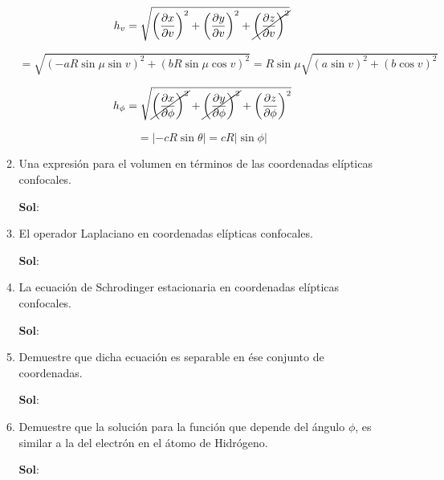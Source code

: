 \documentclass[12pt,a4paper]{article}
\begin{document}
\begin{enumerate}
\begin{enumerate}
    \begin{equation*}
        h_{v} = \sqrt{\left(\frac{\partial x}{\partial v}\right)^2 + \left(\frac{\partial y}{\partial v}\right)^2 + \cancel{\left(\frac{\partial z}{\partial v}\right)^2}}
    \end{equation*}
    
    \begin{equation*}
        = \sqrt{\left(-aR\sin{\mu}\sin{v}\right)^{2}+ \left(bR\sin{\mu}\cos{v}\right)^2}= R\sin{\mu}\sqrt{(a\sin{v})^2+(b\cos{v})^2}
    \end{equation*}
    
    \begin{equation*}
        h_{\phi} = \sqrt{\cancel{\left(\frac{\partial x}{\partial \phi}\right)^2} + \cancel{\left(\frac{\partial y}{\partial \phi}\right)^2} + \left(\frac{\partial z}{\partial \phi}\right)^2}
    \end{equation*}
    
    \begin{equation*}
        = \left| -cR\sin{\theta}\right|=cR|\sin{\phi}|
    \end{equation*}
    
    \item Una expresión para el volumen en términos de las coordenadas elípticas confocales.
    
    \textbf{Sol}:
    
    
    
    \item El operador Laplaciano en coordenadas elípticas confocales.
    
    \textbf{Sol}:
    
    
    \item La ecuación de Schrodinger estacionaria en coordenadas elípticas confocales.
    
    \textbf{Sol}:
    
    
    \item Demuestre que dicha ecuación es separable en ése conjunto de coordenadas.
    
    \textbf{Sol}:
    
    
    \item Demuestre que la solución para la función que depende del ángulo $\phi$, es similar a la del electrón en el átomo de Hidrógeno.
    
    \textbf{Sol}:
    
\end{enumerate}




\end{enumerate}
\end{document}
